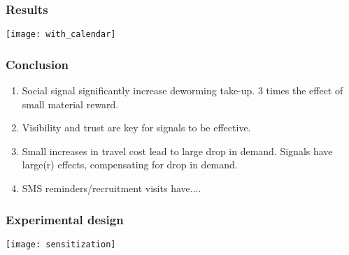 \documentclass{beamer}
\theoremstyle{plain}
\begin{document}
\begin{frame}[label=slide26]
\frametitle{\large{Results}}
\begin{center}
\texttt{[image: with\_calendar]}
\end{center}
\end{frame}


\begin{frame}[label=slide26]
\frametitle{\large{Conclusion}}
\begin{enumerate}
\item Social signal significantly increase deworming take-up. 3 times the effect of small material reward.
\item Visibility and trust are key for signals to be effective. 
\item Small increases in travel cost lead to large drop in demand. Signals have large(r) effects, compensating for drop in demand. %
\bigskip
\item SMS reminders/recruitment visits have....
\end{enumerate}
\end{frame}



\begin{frame}[label=slide100]
\frametitle{\large{Experimental design}} 
\begin{center}
\texttt{[image: sensitization]}
\end{center}
\hyperlink{slide5}{}  
\end{frame}
\end{document}

